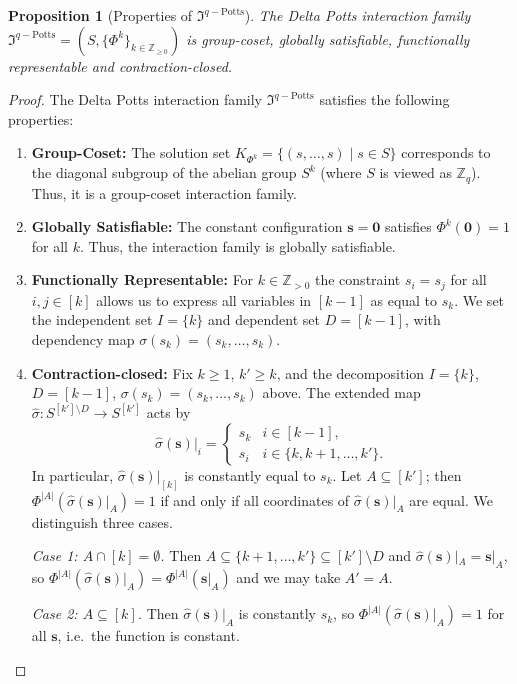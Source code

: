 \documentclass[11pt,reqno]{amsart}
\newcommand{\vecs}{\boldsymbol{s}}
\newcommand{\veco}{\boldsymbol{0}}
\newcommand{\mcp}{\mathfrak{I}^{q-\mathrm{Potts}}}
\theoremstyle{plain}
\newtheorem{proposition}[theorem]{Proposition}
\theoremstyle{definition}
\numberwithin{equation}{section}
\begin{document}
\begin{proposition}[Properties of $\mcp$]
    The Delta Potts interaction family $\mcp = (S, \{\Phi^k\}_{k \in \mathbb{Z}_{\geq 0}})$ is group-coset, globally satisfiable, functionally representable and contraction-closed.
\end{proposition}
\begin{proof}
    The Delta Potts interaction family $\mcp$ satisfies the following properties:
    \begin{enumerate}
        \item \textbf{Group-Coset:} The solution set $K_{\Phi^k} = \{ (s, \dots, s) \mid s \in S \}$ corresponds to the diagonal subgroup of the abelian group $S^k$ (where $S$ is viewed as $\mathbb{Z}_q$). Thus, it is a group-coset interaction family.
        \item \textbf{Globally Satisfiable:} The constant configuration $\vecs = \veco$ satisfies $\Phi^k(\veco) = 1$ for all $k$. Thus, the interaction family is globally satisfiable.
        \item \textbf{Functionally Representable:} For $k \in \mathbb{Z}_{>0}$ the constraint $s_i = s_j$ for all $i,j \in [k]$ allows us to express all variables in $[k-1]$ as equal to $s_k$. We set the independent set $I=\{k\}$ and dependent set $D = [k-1]$, with dependency map $\sigma(s_k) = (s_k, \dots, s_k)$.
        \item \textbf{Contraction-closed:} Fix $k \geq 1$, $k' \geq k$, and the
decomposition $I = \{k\}$, $D = [k-1]$, $\sigma(s_k) = (s_k, \dots, s_k)$
above. The extended map $\hat\sigma \colon S^{[k'] \setminus D} \to S^{[k']}$
acts by
\[
    \hat\sigma(\vecs)|_i =
    \begin{cases}
        s_k & i \in [k-1], \\
        s_i & i \in \{k, k+1, \dots, k'\}.
    \end{cases}
\]
In particular, $\hat\sigma(\vecs)|_{[k]}$ is constantly equal to $s_k$. Let
$A \subseteq [k']$; then $\Phi^{|A|}(\hat\sigma(\vecs)|_A) = 1$ if and
only if all coordinates of $\hat\sigma(\vecs)|_A$ are equal. We
distinguish three cases.

\emph{Case 1: $A \cap [k] = \emptyset$.} Then $A \subseteq
\{k+1,\dots,k'\} \subseteq [k'] \setminus D$ and $\hat\sigma(\vecs)|_A =
\vecs|_A$, so $\Phi^{|A|}(\hat\sigma(\vecs)|_A) = \Phi^{|A|}(\vecs|_A)$
and we may take $A' = A$.

\emph{Case 2: $A \subseteq [k]$.} Then $\hat\sigma(\vecs)|_A$ is constantly
$s_k$, so $\Phi^{|A|}(\hat\sigma(\vecs)|_A) = 1$ for all $\vecs$, i.e.\ the
function is constant.


\end{enumerate}
\end{proof}
\end{document}
